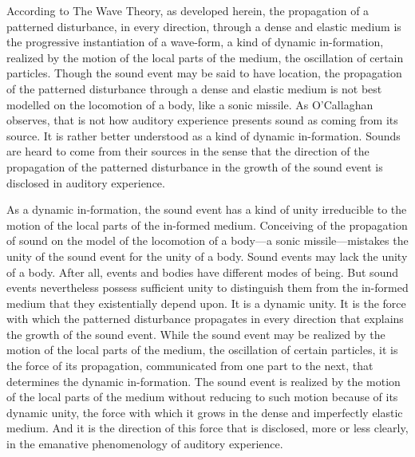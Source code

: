 \documentclass[12pt]{article}
\begin{document}
According to The Wave Theory, as developed herein, the propagation of a patterned disturbance, in every direction, through a dense and elastic medium is the progressive instantiation of a wave-form, a kind of dynamic in-formation, realized by the motion of the local parts of the medium, the oscillation of certain particles. Though the sound event may be said to have location, the propagation of the patterned disturbance through a dense and elastic medium is not best modelled on the locomotion of a body, like a sonic missile. As O’Callaghan observes, that is not how auditory experience presents sound as coming from its source. It is rather better understood as a kind of dynamic in-formation. Sounds are heard to come from their sources in the sense that the direction of the propagation of the patterned disturbance in the growth of the sound event is disclosed in auditory experience. 

As a dynamic in-formation, the sound event has a kind of unity irreducible to the motion of the local parts of the in-formed medium. Conceiving of the propagation of sound on the model of the locomotion of a body—a sonic missile—mistakes the unity of the sound event for the unity of a body. Sound events may lack the unity of a body. After all, events and bodies have different modes of being. But sound events nevertheless possess sufficient unity to distinguish them from the in-formed medium that they existentially depend upon. It is a dynamic unity. It is the force with which the patterned disturbance propagates in every direction that explains the growth of the sound event. While the sound event may be realized by the motion of the local parts of the medium, the oscillation of certain particles, it is the force of its propagation, communicated from one part to the next, that determines the dynamic in-formation. The sound event is realized by the motion of the local parts of the medium without reducing to such motion because of its dynamic unity, the force with which it grows in the dense and imperfectly elastic medium. And it is the direction of this force that is disclosed, more or less clearly, in the emanative phenomenology of auditory experience.



\nocite{Shields:2016ix}
\nocite{Hett:1936fk}

 
 
\end{document}
